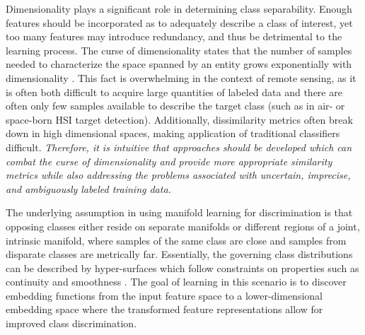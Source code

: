 Dimensionality plays a significant role in determining class separability.  Enough features should be incorporated as to adequately describe a class of interest, yet too many features may introduce redundancy, and thus be detrimental to the learning process. The curse of dimensionality states that the number of samples needed to characterize the space spanned by an entity grows exponentially with dimensionality \citep{Murphy2012, Theodoris2008KPCA}.  This fact is overwhelming in the context of remote sensing, as it is often both difficult to acquire large quantities of labeled data and there are often only few samples available to describe the target class (such as in air- or space-born HSI target detection). Additionally, dissimilarity metrics often break down in high dimensional spaces, making application of traditional classifiers difficult.  \textit{Therefore,  it is intuitive that approaches should be developed which can combat the curse of dimensionality and provide more appropriate similarity metrics while also addressing the problems associated with uncertain, imprecise, and ambiguously labeled training data.}

The underlying assumption in using manifold learning for discrimination is that opposing classes either reside on separate manifolds or different regions of a joint, intrinsic manifold, where samples of the same class are close and samples from disparate classes are metrically far.  Essentially, the governing class distributions can be described by hyper-surfaces which follow constraints on properties such as continuity and smoothness \citep{Belkin2004SemiSupLearningRiemannianManifolds}.  The goal of learning in this scenario is to discover embedding functions from the input feature space to a lower-dimensional embedding space where the transformed feature representations allow for improved class discrimination.


